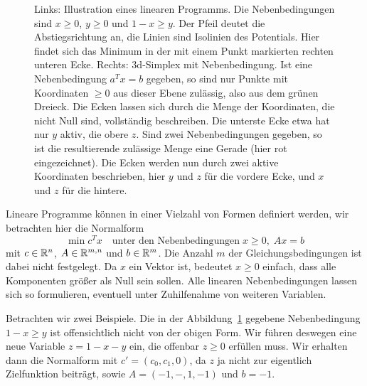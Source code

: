 \begin{figure}
  \caption{Links: Illustration eines linearen Programms. Die
    Nebenbedingungen sind $x\ge 0$, $y\ge 0$ und $1 - x \ge y$. Der
    Pfeil deutet die Abstiegsrichtung an, die Linien sind Isolinien
    des Potentials. Hier findet sich das Minimum in der mit einem
    Punkt markierten rechten unteren Ecke. Rechts: 3d-Simplex mit
    Nebenbedingung. Ist eine Nebenbedingung $a^Tx=b$ gegeben, so sind
    nur Punkte mit Koordinaten $\ge 0$ aus dieser Ebene zulässig, also
    aus dem grünen Dreieck. Die Ecken lassen sich durch die Menge der
    Koordinaten, die nicht Null sind, vollständig beschreiben. Die
    unterste Ecke etwa hat nur $y$ aktiv, die obere $z$. Sind zwei
    Nebenbedingungen gegeben, so ist die resultierende zulässige Menge
    eine Gerade (hier rot eingezeichnet). Die Ecken werden nun durch
    zwei aktive Koordinaten beschrieben, hier $y$ und $z$ für die
    vordere Ecke, und $x$ und $z$ für die hintere.}
  \label{fig:simplex}
\end{figure}

Lineare Programme können in einer Vielzahl von Formen definiert
werden, wir betrachten hier die Normalform
\begin{equation}
  \label{eq:simplexprob}
  \min c^Tx \quad\text{unter den Nebenbedingungen}\; x\ge 0,\;Ax=b
\end{equation}
mit $c\in\mathbb{R}^n$, $A\in\mathbb{R}^{m,n}$ und $b\in\mathbb{R}^{m}$. Die Anzahl $m$ der
Gleichungsbedingungen ist dabei nicht festgelegt. Da $x$ ein Vektor
ist, bedeutet $x\ge 0$ einfach, dass alle Komponenten größer als Null
sein sollen. Alle linearen Nebenbedingungen lassen sich so
formulieren, eventuell unter Zuhilfenahme von weiteren Variablen.

Betrachten wir zwei Beispiele. Die in der Abbildung~\ref{fig:simplex}
gegebene Nebenbedingung $1 - x \ge y$ ist offensichtlich nicht von der
obigen Form. Wir führen deswegen eine neue Variable $z=1-x-y$ ein, die
offenbar $z\ge 0$ erfüllen muss. Wir erhalten dann die Normalform mit
$c'=(c_0, c_1, 0)$, da $z$ ja nicht zur eigentlich Zielfunktion
beiträgt, sowie $A=(-1,-,1, -1)$ und $b=-1$.

